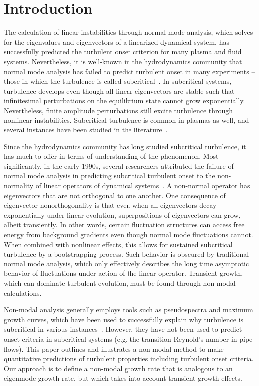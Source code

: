 \documentclass[twocolumn,showkeys,superscriptaddress]{revtex4}
\begin{document}
\section{Introduction}

The calculation of linear instabilities through normal mode analysis, which solves for the eigenvalues and eigenvectors of a linearized dynamical system,
has successfully predicted the turbulent onset criterion for many plasma and fluid systems.
Nevertheless, it is well-known in the hydrodynamics community that normal mode analysis has failed to predict turbulent onset in many experiments -- those in which the
turbulence is called subcritical~\cite{drazin1981}. 
In subcritical systems, turbulence develops even though all linear eigenvectors are stable such that infinitesimal perturbations on the equilibrium state cannot grow exponentially. 
Nevertheless, finite amplitude perturbations still excite turbulence through nonlinear instabilities.
Subcritical turbulence is common in plasmas as well, and several instances have been studied in the literature~\cite{waltz1985,scott1990,nordman1993,biskamp1995,drake1995,itoh1996,camargo1998,krommes1999,camporeale2009,schekochihin2012,highcock2012}. 

Since the hydrodynamics community has long studied subcritical turbulence, it has much to offer in terms of understanding of the phenomenon. Most significantly,
in the early 1990s, several researchers attributed the failure of normal mode analysis in predicting subcritical turbulent onset to the non-normality of linear operators of
dynamical systems~\cite{gustavsson1991,butler1992,trefethen1993,reddy1993,henningson1994,schmid2007}. A non-normal operator has 
eigenvectors that are not orthogonal to one another. One consequence of eigenvector nonorthogonality is that even when all eigenvectors decay exponentially under linear evolution, 
superpositions of eigenvectors can grow, albeit transiently.
In other words, certain fluctuation structures can access free energy from background gradients even though normal mode fluctuations cannot.
When combined with nonlinear effects, this allows for sustained subcritical turbulence by a bootstrapping process.
Such behavior is obscured by traditional normal mode analysis, which only effectively describes the long time asymptotic behavior of fluctuations under  
action of the linear operator. Transient growth, which can dominate turbulent evolution, must be found through non-modal calculations.

Non-modal analysis generally employs tools such as pseudospectra and maximum growth curves, which have been used to successfully explain
why turbulence is subcritical in various instances~\cite{trefethen1993,camargo1998}. 
However, they have not been used to predict onset criteria in subcritical systems (e.g. the transition Reynold's number in pipe flows).
This paper outlines and illustrates a non-modal method to make quantitative predictions of turbulent properties including turbulent onset criteria. 
Our approach is to define a non-modal growth rate that is analogous to an eigenmode growth rate, but which takes into account transient growth effects. 
\end{document}
